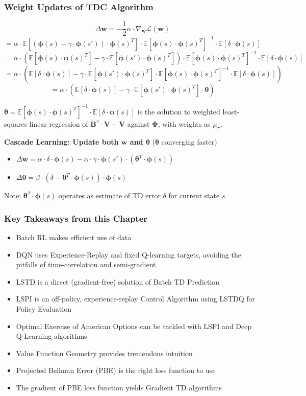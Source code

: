 \documentclass[handout]{beamer}
\newcommand{\bphi}{\bm{\Phi}}
\newcommand{\bb}{\bm{B}^{\pi}}
\newcommand{\bv}{\bm{V}}
\newcommand{\bw}{\bm{w}}
\newcommand{\btheta}{\bm{\theta}}
\begin{document}
\begin{frame}
\frametitle{Weight Updates of TDC Algorithm}
\pause
$$\Delta \bw  = - \frac {1} {2} \alpha \cdot \nabla_{\bw} \mathcal{L}({\bw})$$
$$ = \alpha \cdot \mathbb{E}[(\bm{\phi}(s) - \gamma \cdot \bm{\phi}(s')) \cdot \bm{\phi}(s)^T] \cdot \mathbb{E}[\bm{\phi}(s) \cdot \bm{\phi}(s)^T]^{-1} \cdot \mathbb{E}[\delta \cdot \bm{\phi}(s)]$$
$$ = \alpha \cdot (\mathbb{E}[\bm{\phi}(s) \cdot \bm{\phi}(s)^T] - \gamma \cdot \mathbb{E}[\bm{\phi}(s') \cdot \bm{\phi}(s)^T]) \cdot \mathbb{E}[\bm{\phi}(s) \cdot \bm{\phi}(s)^T]^{-1} \cdot \mathbb{E}[\delta \cdot \bm{\phi}(s)]$$
$$ = \alpha \cdot (\mathbb{E}[\delta \cdot \bm{\phi}(s)] - \gamma \cdot \mathbb{E}[\bm{\phi}(s') \cdot \bm{\phi}(s)^T] \cdot \mathbb{E}[\bm{\phi}(s) \cdot \bm{\phi}(s)^T]^{-1} \cdot \mathbb{E}[\delta \cdot \bm{\phi}(s)])$$
$$ = \alpha \cdot (\mathbb{E}[\delta \cdot \bm{\phi}(s)] - \gamma \cdot \mathbb{E}[\bm{\phi}(s') \cdot \bm{\phi}(s)^T] \cdot \btheta)$$
\pause
\vspace*{2mm}

$\btheta = \mathbb{E}[\bm{\phi}(s) \cdot \bm{\phi}(s)^T]^{-1} \cdot \mathbb{E}[\delta \cdot \bm{\phi}(s)]$ is the solution to weighted least-squares linear regression of $\bb \cdot \bv - \bv$ against $\bphi$, with weights as $\mu_{\pi}$.
\pause
\vspace*{3mm}

{\bf Cascade Learning: Update both $\bw$ and $\btheta$} ($\btheta$ converging faster)
\pause
\begin{itemize}[<+->]
\item $\Delta \bw = \alpha \cdot \delta \cdot \bm{\phi}(s)  - \alpha \cdot \gamma \cdot \bm{\phi}(s') \cdot (\btheta^T \cdot \bm{\phi}(s))$
\item $\Delta \btheta = \beta \cdot (\delta - \btheta^T \cdot \bm{\phi}(s)) \cdot \bm{\phi}(s)$
\end{itemize}
\pause
Note: $\btheta^T \cdot \bm{\phi}(s)$ operates as estimate of TD error $\delta$ for current state $s$
\end{frame}

\begin{frame}
\frametitle{Key Takeaways from this Chapter}
\pause
\begin{itemize}[<+->]
\item Batch RL makes efficient use of data
\item DQN uses Experience-Replay and fixed Q-learning targets, avoiding the pitfalls of time-correlation and semi-gradient
\item LSTD is a direct (gradient-free) solution of Batch TD Prediction
\item LSPI is an off-policy, experience-replay Control Algorithm using LSTDQ for Policy Evaluation
\item Optimal Exercise of American Options can be tackled with LSPI and Deep Q-Learning algorithms
\item Value Function Geometry provides tremendous intuition
\item Projected Bellman Error (PBE) is the right loss function to use
\item The gradient of PBE loss function yields Gradient TD algorithms
\end{itemize}
\end{frame}
\end{document}
